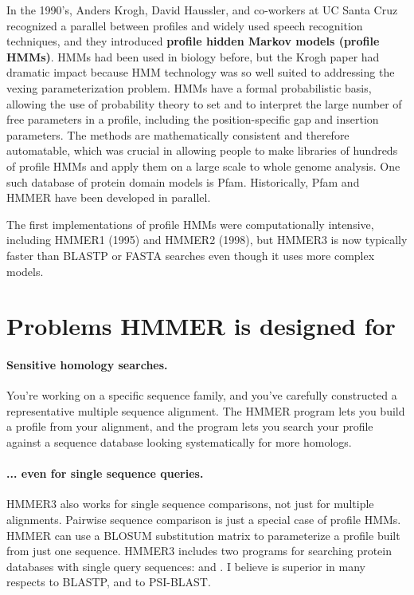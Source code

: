In the 1990's, Anders Krogh, David Haussler, and co-workers at UC
Santa Cruz recognized a parallel between profiles and widely used
speech recognition techniques, and they introduced \textbf{profile
  hidden Markov models (profile HMMs)}.\cite{Krogh94} HMMs had been
used in biology before, but the Krogh paper had dramatic impact
because HMM technology was so well suited to addressing the vexing
parameterization problem. HMMs have a formal probabilistic basis,
allowing the use of probability theory to set and to interpret the
large number of free parameters in a profile, including the
position-specific gap and insertion parameters. The methods are
mathematically consistent and therefore automatable, which was crucial
in allowing people to make libraries of hundreds of profile HMMs and
apply them on a large scale to whole genome analysis.  One such
database of protein domain models is Pfam.\cite{Sonnhammer97}
Historically, Pfam and HMMER have been developed in parallel.

The first implementations of profile HMMs were computationally
intensive, including HMMER1 (1995) and HMMER2 (1998), but HMMER3 is
now typically faster than BLASTP or FASTA searches even though it uses
more complex models.



\section{Problems HMMER is designed for}

\paragraph{Sensitive homology searches.}
You're working on a specific sequence family, and you've carefully
constructed a representative multiple sequence alignment. The HMMER
 program lets you build a profile from your alignment,
and the  program lets you search your profile against
a sequence database looking systematically for more homologs.

\paragraph{... even for single sequence queries.}
HMMER3 also works for single sequence comparisons, not just for
multiple alignments. Pairwise sequence comparison is just a special
case of profile HMMs. HMMER can use a BLOSUM substitution matrix to
parameterize a profile built from just one sequence.  HMMER3 includes
two programs for searching protein databases with single query
sequences:  and . I believe
 is superior in many respects to BLASTP, and
 to PSI-BLAST.

